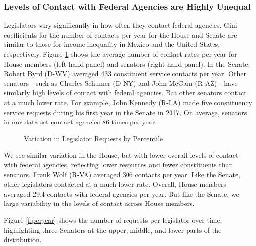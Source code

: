 \documentclass[12pt]{article}
\begin{document}
\subsubsection{Levels of Contact with Federal Agencies are Highly Unequal}
Legislators vary significantly in how often they contact federal agencies. Gini coefficients for the number of contacts per year for the House and Senate are similar to those for income inequality in Mexico and the United States, respectively. Figure \ref{f:contact1} shows the average number of contact rates per year for House members (left-hand panel) and senators (right-hand panel). 
In the Senate, Robert Byrd (D-WV) averaged 433 constituent service contacts per year. Other senators---such as Charles Schumer (D-NY) and John McCain (R-AZ)---have similarly high levels of contact with federal agencies. But other senators contact at a much lower rate. For example, John Kennedy (R-LA) made five constituency service requests during his first year in the Senate in 2017. On average, senators in our data set contact agencies 86 times per year.   
 
\begin{figure}
\centering
\caption{Variation in Legislator Requests by Percentile} \label{f:contact1} 
\begin{minipage}{\textwidth}
\end{minipage}
\end{figure}


We see similar variation in the House, but with lower overall levels of contact with federal agencies, reflecting lower resources and fewer constituents than senators. Frank Wolf (R-VA) averaged 306 contacts per year. Like the Senate, other legislators contacted at a much lower rate. Overall, House members averaged 29.4 contacts with federal agencies per year. But like the Senate, we large variability in the levels of contact across House members.  

Figure \ref{f:peryear} shows the number of requests per legislator over time, highlighting three Senators at the upper, middle, and lower parts of the distribution.
\end{document}
